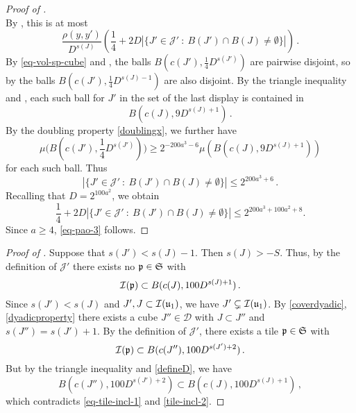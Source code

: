 \begin{proof}[Proof of ]
$$        $$
        By , this is at most
        $$
             \frac{\rho(y,y')}{D^{s(J)}} \left( \frac{1}{4} + 2D |\{J' \in \mathcal{J}' \ : \ B(J') \cap B(J) \ne \emptyset\}|\right)\,.
        $$
        By \eqref{eq-vol-sp-cube} and , the balls $B(c(J'), \frac{1}{4} D^{s(J')})$ are pairwise disjoint, so by  the balls $B(c(J'), \frac{1}{4} D^{s(J) - 1})$ are also disjoint. By the triangle inequality and , each such ball for $J'$ in the set of the last display is contained in
        $$
            B(c(J), 9 D^{s(J) + 1})\,.
        $$
        By the doubling property \eqref{doublingx}, we further have
        $$
            \mu\Big(B(c(J'), \frac{1}{4}D^{s(J')})\Big) \ge 2^{-200a^3 - 6} \mu(B(c(J), 9 D^{s(J) + 1}))
        $$
        for each such ball.
        Thus
        $$
            |\{J' \in \mathcal{J}' \ : \ B(J') \cap B(J) \ne \emptyset\}| \le 2^{200a^3 + 6}\,.
        $$
        Recalling that $D=2^{100a^2}$, we obtain
        $$\frac{1}{4} + 2D |\{J' \in \mathcal{J}' \ : \ B(J') \cap B(J) \ne \emptyset\}|\leq 2^{200a^3 + 100a^2+ 8}.$$
        Since $a\ge 4$, \eqref{eq-pao-3} follows.
    \end{proof}

    \begin{proof}[Proof of ]
        Suppose that $s(J') < s(J) - 1$. Then $s(J) > -S$. Thus, by the definition of $\mathcal{J}'$ there exists no ${\mathfrak p} \in \mathfrak{S}$ with
      \begin{equation}
            \label{eq-tile-incl-1}
            {\mathcal{I}}({\mathfrak p}) \subset B(c(J), 100D^{s(J) + 1})\,.
        \end{equation}
        Since $s(J') < s(J)$ and $J', J \subset {\mathcal{I}}({\mathfrak u}_1)$, we have $J' \subsetneq {\mathcal{I}}({\mathfrak u}_1)$.
        By \eqref{coverdyadic}, \eqref{dyadicproperty} there exists a cube $J'' \in \mathcal{D}$ with $J \subset J''$ and $s(J'') = s(J') + 1$. By the definition of $\mathcal{J}'$, there exists a tile ${\mathfrak p} \in \mathfrak{S}$ with
      \begin{equation}
            \label{tile-incl-2}
            {\mathcal{I}}({\mathfrak p}) \subset B(c(J''), 100 D^{s(J')+2})\,.
        \end{equation}
        But by the triangle inequality and \eqref{defineD}, we have
        $$
            B(c(J''), 100 D^{s(J')+2}) \subset B(c(J), 100D^{s(J) + 1})\,,
        $$
        which contradicts \eqref{eq-tile-incl-1} and \eqref{tile-incl-2}.
    \end{proof}


